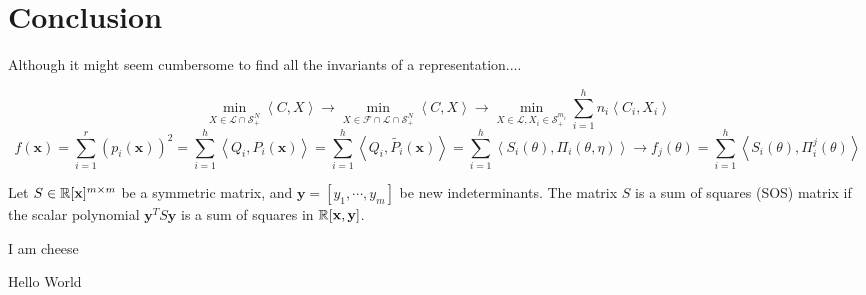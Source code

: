 \documentclass[]{article}
\begin{document}
\section{Conclusion}
Although it might seem cumbersome to find all the invariants of a representation.... 



\[ \min_{X\in\mathcal{L}\cap \mathcal{S}_+^N } \left<C,X\right> \rightarrow 
\min_{X\in\mathcal{F}\cap\mathcal{L}\cap \mathcal{S}_+^N } \left<C,X\right> \rightarrow
\min_{X\in\mathcal{L}, X_i \in \mathcal{S}_+^{m_i} }\sum_{i=1}^{h} n_i\left<C_i,X_i\right>\]
\[f(\mathbf{x}) = \sum_{i= 1}^{r} (p_i(\mathbf{x}))^2 
                = \sum_{i=1}^{h}\left<Q_i,P_i(\mathbf{x})\right> 
                = \sum_{i=1}^{h}\left<Q_i,\tilde{P_i}(\mathbf{x})\right>
                = \sum_{i=1}^{h}\left<S_i(\theta),\Pi_i(\theta,\eta)\right> 
                \rightarrow f_j(\theta) = \sum_{i=1}^{h}\left<S_i(\theta),\Pi_i^j(\theta)\right>  \]

\begin{definition}
    Let $S\in \mathbb R[\textbf{x}]^{m\times m}$ be a symmetric matrix, and $\textbf{y} = [y_1,\cdots,y_m]$ be new indeterminants. The matrix $S$ is a sum of squares (SOS) matrix if the scalar polynomial $\textbf{y}^TS\textbf{y}$ 
    is a sum of squares in $\mathbb R[\textbf{x},\textbf{y}]$.   
\end{definition}

\begin{definition}
    
\end{definition}

\cite{Gatermann_2004}
I am cheese


Hello World
\end{document}
